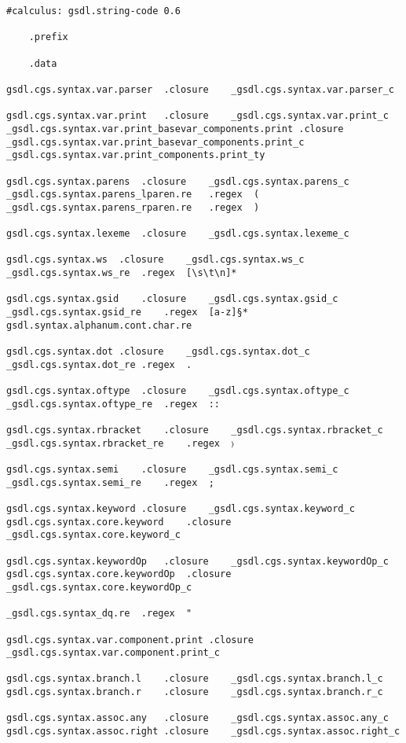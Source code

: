 \documentclass{report}
\begin{document}
\begin{verbatim}
#calculus: gsdl.string-code 0.6

	.prefix

	.data

gsdl.cgs.syntax.var.parser	.closure	_gsdl.cgs.syntax.var.parser_c

gsdl.cgs.syntax.var.print	.closure	_gsdl.cgs.syntax.var.print_c
_gsdl.cgs.syntax.var.print_basevar_components.print	.closure	_gsdl.cgs.syntax.var.print_basevar_components.print_c	_gsdl.cgs.syntax.var.print_components.print_ty

gsdl.cgs.syntax.parens	.closure	_gsdl.cgs.syntax.parens_c
_gsdl.cgs.syntax.parens_lparen.re	.regex	(
_gsdl.cgs.syntax.parens_rparen.re	.regex	)

gsdl.cgs.syntax.lexeme	.closure	_gsdl.cgs.syntax.lexeme_c

gsdl.cgs.syntax.ws	.closure	_gsdl.cgs.syntax.ws_c
_gsdl.cgs.syntax.ws_re	.regex	[\s\t\n]*

gsdl.cgs.syntax.gsid	.closure	_gsdl.cgs.syntax.gsid_c
_gsdl.cgs.syntax.gsid_re	.regex	[a-z]§*	gsdl.syntax.alphanum.cont.char.re

gsdl.cgs.syntax.dot	.closure	_gsdl.cgs.syntax.dot_c
_gsdl.cgs.syntax.dot_re	.regex	.

gsdl.cgs.syntax.oftype	.closure	_gsdl.cgs.syntax.oftype_c
_gsdl.cgs.syntax.oftype_re	.regex	::

gsdl.cgs.syntax.rbracket	.closure	_gsdl.cgs.syntax.rbracket_c
_gsdl.cgs.syntax.rbracket_re	.regex	〉

gsdl.cgs.syntax.semi	.closure	_gsdl.cgs.syntax.semi_c
_gsdl.cgs.syntax.semi_re	.regex	;

gsdl.cgs.syntax.keyword	.closure	_gsdl.cgs.syntax.keyword_c
gsdl.cgs.syntax.core.keyword	.closure	_gsdl.cgs.syntax.core.keyword_c

gsdl.cgs.syntax.keywordOp	.closure	_gsdl.cgs.syntax.keywordOp_c
gsdl.cgs.syntax.core.keywordOp	.closure	_gsdl.cgs.syntax.core.keywordOp_c

_gsdl.cgs.syntax_dq.re	.regex	"

gsdl.cgs.syntax.var.component.print	.closure	_gsdl.cgs.syntax.var.component.print_c

gsdl.cgs.syntax.branch.l	.closure	_gsdl.cgs.syntax.branch.l_c
gsdl.cgs.syntax.branch.r	.closure	_gsdl.cgs.syntax.branch.r_c

gsdl.cgs.syntax.assoc.any	.closure	_gsdl.cgs.syntax.assoc.any_c
gsdl.cgs.syntax.assoc.right	.closure	_gsdl.cgs.syntax.assoc.right_c


\end{verbatim}
\end{document}

